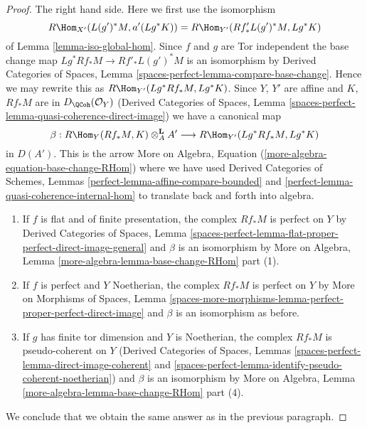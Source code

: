 \begin{proof}
\medskip\noindent
The right hand side. Here we first use the isomorphism
$$
R\Hom_{X'}(L(g')^*M, a'(Lg^*K)) = R\Hom_{Y'}(Rf'_*L(g')^*M, Lg^*K)
$$
of Lemma \ref{lemma-iso-global-hom}. Since $f$ and $g$ are
Tor independent the base change
map $Lg^*Rf_*M \to Rf'_*L(g')^*M$ is an isomorphism by
Derived Categories of Spaces, Lemma
\ref{spaces-perfect-lemma-compare-base-change}.
Hence we may rewrite this as $R\Hom_{Y'}(Lg^*Rf_*M, Lg^*K)$.
Since $Y$, $Y'$ are affine and $K$, $Rf_*M$ are in $D_\QCoh(\mathcal{O}_Y)$
(Derived Categories of Spaces, Lemma
\ref{spaces-perfect-lemma-quasi-coherence-direct-image})
we have a canonical map
$$
\beta :
R\Hom_Y(Rf_*M, K) \otimes^\mathbf{L}_A A'
\longrightarrow
R\Hom_{Y'}(Lg^*Rf_*M, Lg^*K)
$$
in $D(A')$. This is the arrow
More on Algebra, Equation (\ref{more-algebra-equation-base-change-RHom})
where we have used Derived Categories of Schemes, Lemmas
\ref{perfect-lemma-affine-compare-bounded} and
\ref{perfect-lemma-quasi-coherence-internal-hom}
to translate back and forth into algebra.
\begin{enumerate}
\item If $f$ is flat and of finite presentation, the complex $Rf_*M$
is perfect on $Y$ by Derived Categories of Spaces, Lemma
\ref{spaces-perfect-lemma-flat-proper-perfect-direct-image-general}
and $\beta$ is an isomorphism by
More on Algebra, Lemma \ref{more-algebra-lemma-base-change-RHom} part (1).
\item If $f$ is perfect and $Y$ Noetherian, the complex $Rf_*M$
is perfect on $Y$ by More on Morphisms of Spaces, Lemma
\ref{spaces-more-morphisms-lemma-perfect-proper-perfect-direct-image}
and $\beta$ is an isomorphism as before.
\item If $g$ has finite tor dimension and $Y$ is Noetherian,
the complex $Rf_*M$ is pseudo-coherent on $Y$
(Derived Categories of Spaces, Lemmas
\ref{spaces-perfect-lemma-direct-image-coherent} and
\ref{spaces-perfect-lemma-identify-pseudo-coherent-noetherian})
and $\beta$ is an isomorphism by
More on Algebra, Lemma \ref{more-algebra-lemma-base-change-RHom} part (4).
\end{enumerate}
We conclude that we obtain the same answer as in the previous paragraph.


\end{proof}
